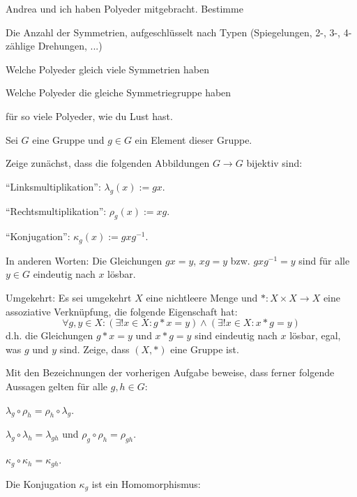 \begin{sheet}

\begin{problem}
Andrea und ich haben Polyeder mitgebracht. Bestimme
\begin{subproblem}
Die Anzahl der Symmetrien, aufgeschlüsselt nach Typen (Spiegelungen, 2-, 3-, 4-zählige Drehungen, ...)
\end{subproblem}
\begin{subproblem}
Welche Polyeder gleich viele Symmetrien haben
\end{subproblem}
\begin{subproblem}
Welche Polyeder die gleiche Symmetriegruppe haben
\end{subproblem}
für so viele Polyeder, wie du Lust hast.
\end{problem}

\begin{problem}
Sei $G$ eine Gruppe und $g\in G$ ein Element dieser Gruppe.

Zeige zunächst, dass die folgenden Abbildungen $G\to G$ bijektiv sind:
\begin{subproblem}
\enquote{Linksmultiplikation}: $\lambda_g(x):=gx$.
\end{subproblem}
\begin{subproblem}
\enquote{Rechtsmultiplikation}: $\rho_g(x):=xg$.
\end{subproblem}
\begin{subproblem}
\enquote{Konjugation}: $\kappa_g(x):=gxg^{-1}$.
\end{subproblem}
In anderen Worten: Die Gleichungen $gx=y$, $xg=y$ bzw. $gxg^{-1} = y$ sind für alle $y\in G$ eindeutig nach $x$ lösbar.

\begin{subproblem}
Umgekehrt: Es sei umgekehrt $X$ eine nichtleere Menge und $\ast: X\times X\to X$ eine assoziative Verknüpfung, die folgende Eigenschaft hat:
\[\forall g,y\in X: (\exists! x\in X: g \ast x=y) \wedge (\exists! x\in X: x \ast g=y)\]
d.h. die Gleichungen $g \ast x=y$ und $x \ast g=y$ sind eindeutig nach $x$ lösbar, egal, was $g$ und $y$ sind. Zeige, dass $(X,\ast)$ eine Gruppe ist.
\end{subproblem}
\end{problem}

\begin{problem}
Mit den Bezeichnungen der vorherigen Aufgabe beweise, dass ferner folgende Aussagen gelten für alle $g,h\in G$:
\begin{subproblem}
$\lambda_g \circ \rho_h = \rho_h \circ \lambda_g$.
\end{subproblem}
\begin{subproblem}
$\lambda_g \circ \lambda_h = \lambda_{gh}$ und $\rho_g \circ \rho_h = \rho_{gh}$.
\end{subproblem}
\begin{subproblem}
$\kappa_g\circ\kappa_h = \kappa_{gh}$.
\end{subproblem}
\begin{subproblem}
Die Konjugation $\kappa_g$ ist ein Homomorphismus:


\end{subproblem}
\end{problem}
\end{sheet}
